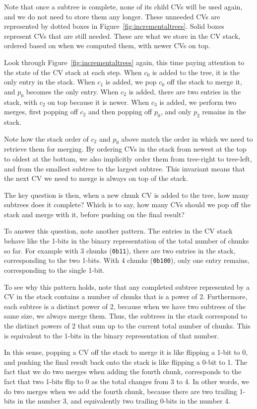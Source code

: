 \documentclass[11pt,notitlepage,a4paper]{article}
\begin{document}
Note that once a subtree is complete, none of its child CVs will be used again,
and we do not need to store them any longer. These unneeded CVs are represented
by dotted boxes in Figure~\ref{fig:incrementaltrees}. Solid boxes represent CVs
that are still needed. These are what we store in the CV stack, ordered based
on when we computed them, with newer CVs on top.

Look through Figure~\ref{fig:incrementaltrees} again, this time paying
attention to the state of the CV stack at each step. When $c_0$ is added to the
tree, it is the only entry in the stack. When $c_1$ is added, we pop $c_0$ off
the stack to merge it, and $p_0$ becomes the only entry. When $c_2$ is added,
there are two entries in the stack, with $c_2$ on top because it is newer. When
$c_3$ is added, we perform two merges, first popping off $c_2$ and then popping
off $p_0$, and only $p_2$ remains in the stack.

Note how the stack order of $c_2$ and $p_0$ above match the order in which we
need to retrieve them for merging. By ordering CVs in the stack from newest at
the top to oldest at the bottom, we also implicitly order them from tree-right
to tree-left, and from the smallest subtree to the largest subtree. This
invariant means that the next CV we need to merge is always on top of the
stack.

The key question is then, when a new chunk CV is added to the tree, how many
subtrees does it complete? Which is to say, how many CVs should we pop off the
stack and merge with it, before pushing on the final result?

To answer this question, note another pattern. The entries in the CV stack
behave like the 1-bits in the binary representation of the total number of
chunks so far. For example with 3 chunks (\texttt{0b11}), there are two entries in the
stack, corresponding to the two 1-bits. With 4 chunks (\texttt{0b100}), only one entry
remains, corresponding to the single 1-bit.

To see why this pattern holds, note that any completed subtree represented by a
CV in the stack contains a number of chunks that is a power of 2. Furthermore,
each subtree is a distinct power of 2, because when we have two subtrees of the
same size, we always merge them. Thus, the subtrees in the stack correspond to
the distinct powers of 2 that sum up to the current total number of chunks.
This is equivalent to the 1-bits in the binary representation of that number.

In this sense, popping a CV off the stack to merge it is like flipping a 1-bit
to 0, and pushing the final result back onto the stack is like flipping a 0-bit
to 1. The fact that we do two merges when adding the fourth chunk, corresponds
to the fact that two 1-bits flip to 0 as the total changes from 3 to 4. In
other words, we do two merges when we add the fourth chunk, because there are
two trailing 1-bits in the number 3, and equivalently two trailing 0-bits in
the number 4.
\end{document}
